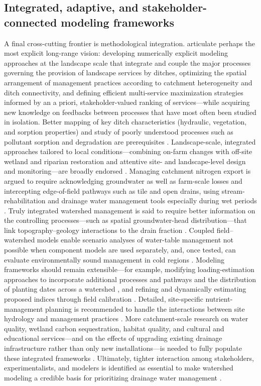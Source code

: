 \subsection{Integrated, adaptive, and stakeholder-connected modeling frameworks}

A final cross-cutting frontier is methodological integration. \textcite{Dollinger2015} articulate perhaps the most explicit long-range vision: developing numerically explicit modeling approaches at the landscape scale that integrate and couple the major processes governing the provision of landscape services by ditches, optimizing the spatial arrangement of management practices according to catchment heterogeneity and ditch connectivity, and defining efficient multi-service maximization strategies informed by an a priori, stakeholder-valued ranking of services---while acquiring new knowledge on feedbacks between processes that have most often been studied in isolation. Better mapping of key ditch characteristics (hydraulic, vegetation, and sorption properties) and study of poorly understood processes such as pollutant sorption and degradation are prerequisites \parencite{Dollinger2015,Herzon2008}. Landscape-scale, integrated approaches tailored to local conditions---combining on-farm changes with off-site wetland and riparian restoration and attentive site- and landscape-level design and monitoring---are broadly endorsed \parencite{Blann2009}. Managing catchment nitrogen export is argued to require acknowledging groundwater as well as farm-scale losses and intercepting edge-of-field pathways such as tile and open drains, using stream-rehabilitation and drainage water management tools especially during wet periods \parencite{Goeller2019}. Truly integrated watershed management is said to require better information on the controlling processes---such as spatial groundwater-head distribution---that link topography--geology interactions to the drain fraction \parencite{Mahmood2023}. Coupled field--watershed models enable scenario analyses of water-table management not possible when component models are used separately, and, once tested, can evaluate environmentally sound management in cold regions \parencite{Dayyani2010}. Modeling frameworks should remain extensible---for example, modifying loading-estimation approaches to incorporate additional processes and pathways and the distribution of planting dates across a watershed \parencite{Basu2010}, and refining and dynamically estimating proposed indices through field calibration \parencite{Tao2025}. Detailed, site-specific nutrient-management planning is recommended to handle the interactions between site hydrology and management practices \parencite{Kurz2005}. More catchment-scale research on water quality, wetland carbon sequestration, habitat quality, and cultural and educational services---and on the effects of upgrading existing drainage infrastructure rather than only new installations---is needed to fully populate these integrated frameworks \parencite{Mitchell2022}. Ultimately, tighter interaction among stakeholders, experimentalists, and modelers is identified as essential to make watershed modeling a credible basis for prioritizing drainage water management \parencite{Wang2020b,Kröger2013}.